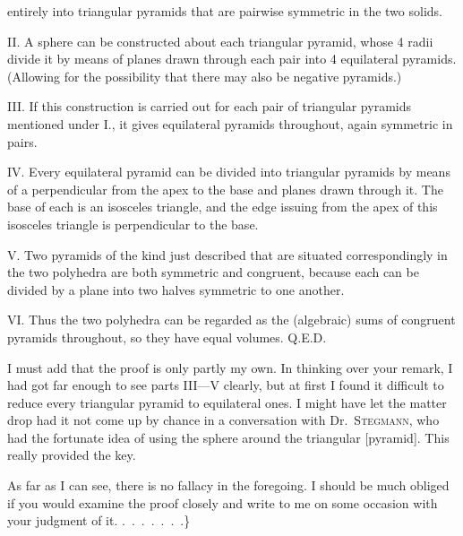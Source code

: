 %
\noindent entirely into triangular pyramids that are pairwise symmetric in the two solids.

II. A sphere can be constructed about each triangular pyramid, whose 4 radii divide it by means of planes drawn through each pair into 4 equilateral pyramids. (Allowing for the possibility that there may also be negative pyramids.)

III. If this construction is carried out for each pair of triangular pyramids mentioned under I., it gives equilateral pyramids throughout, again symmetric in pairs.

IV. Every equilateral pyramid can be divided into  triangular pyramids by means of a perpendicular from the apex to the base and planes drawn through it. The base of each is an isosceles triangle, and the edge issuing from the apex of this isosceles triangle is perpendicular to the base.

V. Two pyramids of the kind just described that are situated correspondingly in the two polyhedra are both symmetric and congruent, because each can be divided by a plane into two halves symmetric to one another.

VI. Thus the two polyhedra can be regarded as the (algebraic) sums of congruent pyramids throughout, so they have equal volumes. Q.E.D.

I must add that the proof is only partly my own. In thinking over your remark, I had got far enough to see parts III---V clearly, but at first I found it difficult to reduce every triangular pyramid to equilateral ones. I might have let the matter drop had it not come up by chance in a conversation with Dr.\ \textsc{Stegmann}, who had the fortunate idea of using the sphere around the triangular [pyramid]. This really provided the key.

As far as I can see, there is no fallacy in the foregoing. I should be much obliged if you would examine the proof closely and write to me on some occasion with your judgment of it. \mbox{.\ .\ .\ .\ .\ .\ .}\}
